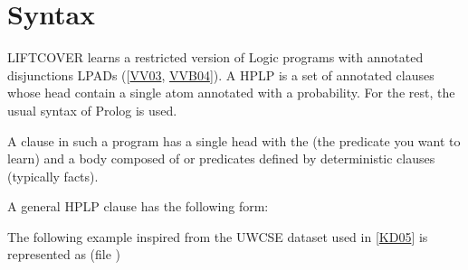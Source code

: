 \documentclass[letterpaper,10pt,english]{sphinxmanual}
\begin{document}
\chapter{Syntax}
\label{\detokenize{index:syntax}}
\sphinxAtStartPar
LIFTCOVER learns  a restricted version of Logic programs with annotated disjunctions LPADs ({[}\hyperlink{cite.index:id24}{VV03}, \hyperlink{cite.index:id8}{VVB04}{]}). A HPLP is a set of annotated clauses whose head contain a single atom annotated with a probability. For the rest, the usual syntax of Prolog is used.

\sphinxAtStartPar
A clause in such a program has a single head with the  (the predicate you want to learn)
and a body composed of  or predicates defined by deterministic clauses (typically facts).

\sphinxAtStartPar
A general HPLP clause has the following form:

\begin{sphinxVerbatim}[commandchars=\\\{\}]
 
\end{sphinxVerbatim}

\sphinxAtStartPar
The following example inspired from the UWCSE dataset used in {[}\hyperlink{cite.index:id29}{KD05}{]} is represented as (file )
\end{document}
